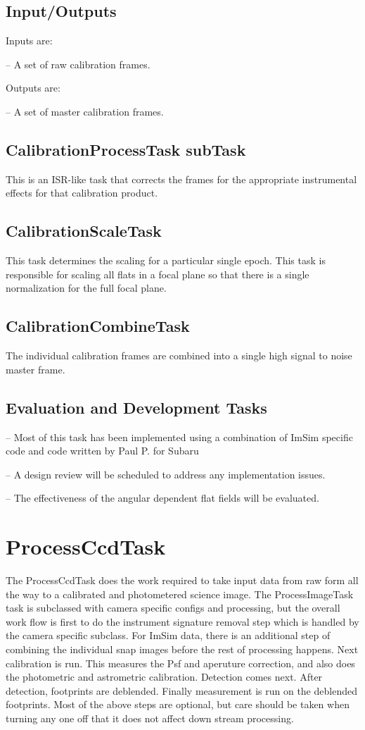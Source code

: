 \documentclass[prd, nofootinbib, floatfix, 11pt,tightenlines,times]{article}
\begin{document}
\subsection{Input/Outputs}
Inputs are:

-- A set of raw calibration frames.

Outputs are:

-- A set of master calibration frames.

\subsection{CalibrationProcessTask subTask}
This is an ISR-like task that corrects the frames for the appropriate instrumental effects for that calibration
product.

\subsection{CalibrationScaleTask}
This task determines the scaling for a particular single epoch.  This task is responsible for
scaling all flats in a focal plane so that there is a single normalization for the full focal plane.

\subsection{CalibrationCombineTask}
The individual calibration frames are combined into a single high signal to noise master frame. 

\subsection{Evaluation and Development Tasks}
-- Most of this task has been implemented using a combination of ImSim specific code and code written by Paul P. for Subaru

-- A design review will be scheduled to address any implementation issues.

-- The effectiveness of the angular dependent flat fields will be evaluated.



\clearpage 
\section{ProcessCcdTask\label{processccdsec}} 
The ProcessCcdTask does the work required to take input data from raw form all the way to a calibrated and
photometered science image.  The ProcessImageTask task is subclassed with camera specific configs and processing, but the overall 
work flow is first to do the instrument signature removal step which is handled by the camera specific subclass.  For ImSim
data, there is an additional step of combining the individual snap images before the rest of processing happens. Next calibration
is run.  This measures the Psf and aperuture correction, and also does the photometric and astrometric calibration.  
Detection comes next.  After detection, footprints are deblended.
Finally measurement is run on the deblended footprints.  Most of the above steps are optional, but care should be taken
when turning any one off that it does not affect down stream processing.
\end{document}
